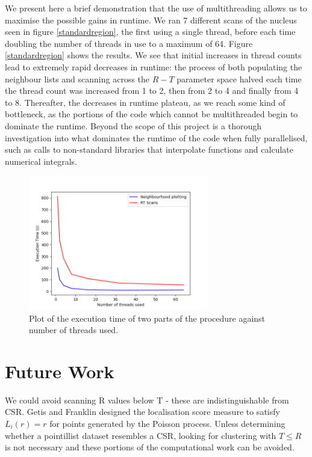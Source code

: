 \documentclass[11pt]{article}
\begin{document}
We present here a brief demonstration that the use of multithreading allows us to maximise the possible gains in runtime. We ran 7 different scans of the nucleus seen in figure \ref{standardregion}, the first using a single thread, before each time doubling the number of threads in use to a maximum of 64. Figure \ref{standardregion} shows the results. We see that initial increases in thread counts lead to extremely rapid decreases in runtime: the process of both populating the neighbour lists and scanning across the $R-T$ parameter space halved each time the thread count was increased from 1 to 2, then from 2 to 4 and finally from 4 to 8. Thereafter, the decreases in runtime plateau, as we reach some kind of bottleneck, as the portions of the code which cannot be multithreaded begin to dominate the runtime.
Beyond the scope of this project is a thorough investigation into what dominates the runtime of the code when fully parallelised, such as calls to non-standard libraries that interpolate functions and calculate numerical integrals.

\begin{figure}
\centering
\includegraphics[width=0.7\textwidth]{figs/multithread.png}
\caption{Plot of the execution time of two parts of the procedure against number of threads used.}
\label{multithread}
\end{figure}




\section{Future Work}
\label{notyetimplemented}
We could avoid scanning R values below T - these are indistinguishable from CSR. Getis and Franklin \cite{getisAndFranklin} designed the localisation score measure to satisfy $L_i(r) = r$ for points generated by the Poisson process. Unless determining whether a pointillist dataset resembles a CSR, looking for clustering with $T \leq R$ is not necessary and these portions of the computational work can be avoided. \\
\end{document}
